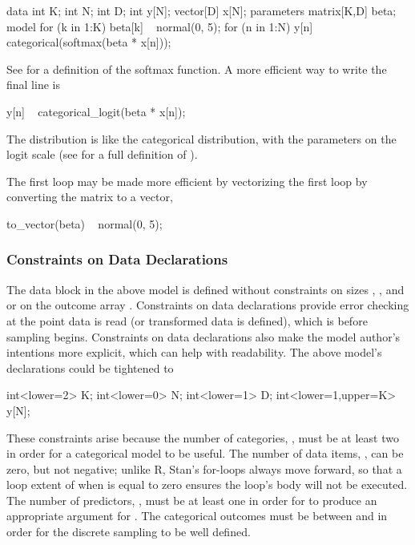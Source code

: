 \begin{stancode}
data {
  int K;
  int N;
  int D;
  int y[N];
  vector[D] x[N];
}
parameters {
  matrix[K,D] beta;
}
model {
  for (k in 1:K)
    beta[k] ~ normal(0, 5);
  for (n in 1:N)
    y[n] ~ categorical(softmax(beta * x[n]));
}
\end{stancode}
%
See  for a definition of the softmax
function.   A more efficient way to write the final line is
%
\begin{stancode}
    y[n] ~ categorical_logit(beta * x[n]);
\end{stancode}
%
The  distribution is like the categorical
distribution, with the parameters on the logit scale (see
 for a full definition of
).

The first loop may be made more efficient by vectorizing the first
loop by converting the matrix  to a vector, 
%
\begin{stancode}
to_vector(beta) ~ normal(0, 5);
\end{stancode}


\subsubsection{Constraints on Data Declarations}

The data block in the above model is defined without constraints on
sizes , , and  or on the outcome array
.  Constraints on data declarations provide error checking at
the point data is read (or transformed data is defined), which is
before sampling begins.  Constraints on data declarations also make
the model author's intentions more explicit, which can help with
readability.  The above model's declarations could be tightened to
%

\begin{stancode}
  int<lower=2> K;
  int<lower=0> N;
  int<lower=1> D;
  int<lower=1,upper=K> y[N];
\end{stancode}
%
These constraints arise because the number of categories, ,
must be at least two in order for a categorical model to be useful.
The number of data items, , can be zero, but not negative;
unlike R, Stan's for-loops always move forward, so that a loop extent
of  when  is equal to zero ensures the loop's body
will not be executed.  The number of predictors, , must be at
least one in order for  to produce an
appropriate argument for .  The categorical outcomes
 must be between  and  in order for the
discrete sampling to be well defined.


